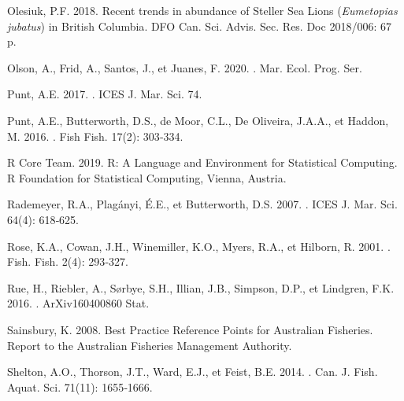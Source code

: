 \documentclass[french,11pt]{book}
\begin{document}
\begin{CSLReferences}{1}{0}
%
Olesiuk, P.F. 2018. Recent trends in abundance of {Steller} Sea Lions ({\emph{Eumetopias jubatus}}) in {British Columbia}. DFO Can. Sci. Advis. Sec. Res. Doc 2018/006: 67 p.

%
Olson, A., Frid, A., Santos, J., et Juanes, F. 2020. . Mar. Ecol. Prog. Ser.

%
Punt, A.E. 2017. . ICES J. Mar. Sci. 74.

%
Punt, A.E., Butterworth, D.S., de Moor, C.L., De Oliveira, J.A.A., et Haddon, M. 2016. . Fish Fish. 17(2): 303‑334.

%
R Core Team. 2019. R: A Language and Environment for Statistical Computing. {R Foundation for Statistical Computing}, Vienna, Austria.

%
Rademeyer, R.A., Plagányi, É.E., et Butterworth, D.S. 2007. . ICES J. Mar. Sci. 64(4): 618‑625.

%
Rose, K.A., Cowan, J.H., Winemiller, K.O., Myers, R.A., et Hilborn, R. 2001. . Fish. Fish. 2(4): 293‑327.

%
Rue, H., Riebler, A., Sørbye, S.H., Illian, J.B., Simpson, D.P., et Lindgren, F.K. 2016. . ArXiv160400860 Stat.

%
Sainsbury, K. 2008. Best {Practice Reference Points} for {Australian Fisheries}. {Report} to the {Australian Fisheries Management Authority}.

%
Shelton, A.O., Thorson, J.T., Ward, E.J., et Feist, B.E. 2014. . Can. J. Fish. Aquat. Sci. 71(11): 1655‑1666.


\end{CSLReferences}
\end{document}
